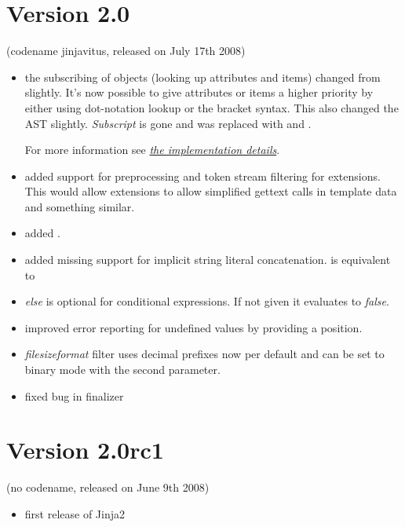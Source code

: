 \documentclass[a4paper,10pt,english]{sphinxmanual}
\begin{document}
\section{Version 2.0}
\label{changelog:version-2-0}
(codename jinjavitus, released on July 17th 2008)
\begin{itemize}
\item {} 
the subscribing of objects (looking up attributes and items) changed from
slightly.  It's now possible to give attributes or items a higher priority
by either using dot-notation lookup or the bracket syntax.  This also
changed the AST slightly.  \emph{Subscript} is gone and was replaced with
{\hyperref[extensions:jinja2.nodes.Getitem]{}} and {\hyperref[extensions:jinja2.nodes.Getattr]{}}.

For more information see {\hyperref[templates:notes-on-subscriptions]{\emph{the implementation details}}}.

\item {} 
added support for preprocessing and token stream filtering for extensions.
This would allow extensions to allow simplified gettext calls in template
data and something similar.

\item {} 
added {\hyperref[api:jinja2.environment.TemplateStream.dump]{}}.

\item {} 
added missing support for implicit string literal concatenation.
 is equivalent to 

\item {} 
\emph{else} is optional for conditional expressions.  If not given it evaluates
to \emph{false}.

\item {} 
improved error reporting for undefined values by providing a position.

\item {} 
\emph{filesizeformat} filter uses decimal prefixes now per default and can be
set to binary mode with the second parameter.

\item {} 
fixed bug in finalizer

\end{itemize}


\section{Version 2.0rc1}
\label{changelog:version-2-0rc1}
(no codename, released on June 9th 2008)
\begin{itemize}
\item {} 
first release of Jinja2

\end{itemize}



\renewcommand{\indexname}{Index}
\printindex
\end{document}

